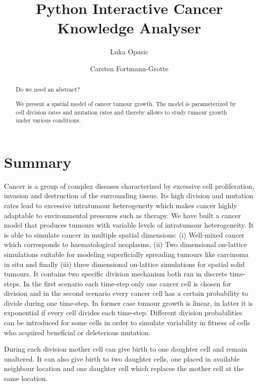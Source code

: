 \documentclass[11pt,a4paper]{article}
\begin{document}
\title{Python Interactive Cancer Knowledge Analyser}

\author[1]{Luka Opasic}
\author[1]{Carsten Fortmann-Grotte}


\date{}
\maketitle

\begin{abstract}
  Do we need an abstract?

  We present a spatial model of cancer tumour growth. The model is
  parameterized by cell division rates and mutation rates and thereby allows to
  study tumour growth under various conditions.
\end{abstract}

\section{Summary}
Cancer is a group of complex diseases characterized by excessive cell proliferation, invasion and destruction of the surrounding tissue.
Its high division and mutation rates lead to excessive intratumour heterogeneity which makes cancer highly adaptable to environmental pressures such as therapy.
We have built a cancer model that produces tumours with variable levels of intratumour heterogeneity.
It is able to simulate cancer in multiple spatial dimensions:
(i) Well-mixed cancer which corresponds to haematological neoplasms,
(ii) Two dimensional on-lattice simulations suitable for modeling superficially spreading tumours like carcinoma in situ and finally
(iii) three dimensional on-lattice simulations for spatial solid tumours.
It contains two specific division mechanism both ran in discrete time-steps. In the first scenario each time-step only one cancer cell is chosen for division and in the second scenario every cancer cell has a certain probability to divide during one time-step.
In former case tumour growth is linear, in latter it is exponential if every cell divides each time-step.
Different division probabilities can be introduced for some cells in order to simulate variability in fitness of cells who acquired beneficial or deleterious mutation.

During each division mother cell can give birth to one daughter cell and remain unaltered.
It can also give birth to two daughter cells, one placed in available neighbour location and one daughter cell which replaces the mother cell at the same location.
\end{document}
